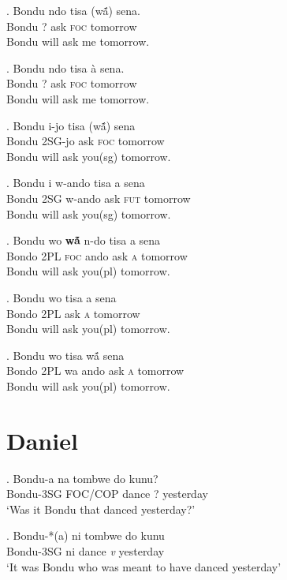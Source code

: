 \documentclass{assets/fieldnotes}
\begin{document}
\exg. Bondu ndo tisa (wã́)  sena.\\
Bondu ? ask \textsc{foc} tomorrow\\
Bondu will ask me tomorrow.

\exg. Bondu ndo tisa à sena.\\
Bondu ? ask \textsc{foc} tomorrow\\
Bondu will ask me tomorrow.

\exg. Bondu i-jo tisa (wã́) sena\\
Bondu 2SG-jo ask \textsc{foc} tomorrow\\
Bondu will ask you(sg) tomorrow.

\exg. Bondu i w-ando tisa a sena\\
Bondu 2SG w-ando ask \textsc{fut} tomorrow\\
Bondu will ask you(sg) tomorrow.

\exg. Bondu wo \textbf{wã́} n-do tisa a sena\\
Bondo 2PL \textsc{foc} ando ask \textsc{a} tomorrow\\
Bondu will ask you(pl) tomorrow.

\exg. Bondu wo tisa a sena\\
Bondo 2PL ask \textsc{a} tomorrow\\
Bondu will ask you(pl) tomorrow.

\exg. Bondu wo tisa wã́  sena\\
Bondo 2PL wa ando ask \textsc{a} tomorrow\\
Bondu will ask you(pl) tomorrow.


\section{Daniel}

\exg. Bondu-a na tombwe do kunu?\\
Bondu-3SG FOC/COP dance ? yesterday\\
`Was it Bondu that danced yesterday?'

\exg. Bondu-*(a) ni tombwe do kunu\\
Bondu-3SG ni dance \textit{v} yesterday\\
`It was Bondu who was meant to have danced yesterday'
\end{document}
